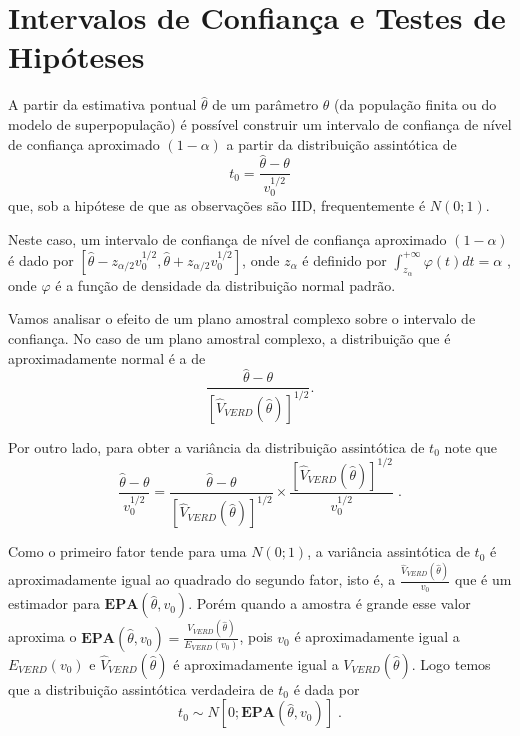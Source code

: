 \documentclass[]{book}
\numberwithin{example}{chapter}
\numberwithin{remark}{chapter}
\numberwithin{definition}{chapter}
\begin{document}
\section{Intervalos de Confiança e Testes de
Hipóteses}\label{intervalos-de-confianca-e-testes-de-hipoteses}

A partir da estimativa pontual \(\hat{\theta}\) de um parâmetro
\(\theta\) (da população finita ou do modelo de superpopulação) é
possível construir um intervalo de confiança de nível de confiança
aproximado \(\left( 1-\alpha \right)\) a partir da distribuição
assintótica de \[
t_{0}=\frac{\hat{\theta}-\theta }{v_{0}^{1/2}} 
\] que, sob a hipótese de que as observações são IID, frequentemente é
\(N\left( 0;1\right)\).

Neste caso, um intervalo de confiança de nível de confiança aproximado
\(\left( 1-\alpha \right)\) é dado por
\(\left[ \hat{\theta}-z_{\alpha /2}v_{0}^{1/2},\hat{\theta}+z_{\alpha /2}v_{0}^{1/2}\right]\),
onde \(z_{\alpha }\) é definido por
\(\int_{z_{\alpha }}^{+\infty }\varphi\left( t\right) dt=\alpha\) , onde
\(\varphi\) é a função de densidade da distribuição normal padrão.

Vamos analisar o efeito de um plano amostral complexo sobre o intervalo
de confiança. No caso de um plano amostral complexo, a distribuição que
é aproximadamente normal é a de \[
\frac{\hat{\theta}-\theta }{\left[ \widehat{V}_{VERD}\left( \hat{\theta}\right) \right] ^{1/2}}. 
\]

Por outro lado, para obter a variância da distribuição assintótica de
\(t_{0}\) note que \[
\frac{\hat{\theta}-\theta }{v_{0}^{1/2}}=\frac{\hat{\theta}-\theta }{\left[ 
\widehat{V}_{VERD}\left( \hat{\theta}\right) \right] ^{1/2}}\times \frac{
\left[ \widehat{V}_{VERD}\left( \hat{\theta}\right) \right] ^{1/2}}{
v_{0}^{1/2}}\;. 
\]

Como o primeiro fator tende para uma \(N\left( 0;1\right)\), a variância
assintótica de \(t_{0}\) é aproximadamente igual ao quadrado do segundo
fator, isto é, a
\(\frac{\widehat{V}_{VERD}\left( \hat{\theta}\right) }{v_{0}}\) que é um
estimador para \(\mathbf{EPA}\left( \hat{\theta},v_{0}\right)\). Porém
quando a amostra é grande esse valor aproxima o
\(\mathbf{EPA}\left( \hat{\theta},v_{0}\right) =\frac{V_{VERD}\left( \hat{\theta}\right) }{E_{VERD}\left( v_{0}\right) }\),
pois \(v_{0}\) é aproximadamente igual a \(E_{VERD}\left( v_{0}\right)\)
e \(\widehat{V}_{VERD}\left( \hat{\theta}\right)\) é aproximadamente
igual a \(V_{VERD}\left( \hat{\theta}\right)\). Logo temos que a
distribuição assintótica verdadeira de \(t_{0}\) é dada por \[
t_{0}\sim N\left[ 0;\mathbf{EPA}\left( \hat{\theta},v_{0}\right)
\right] \;. 
\]
\end{document}

